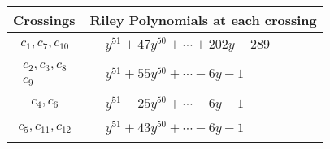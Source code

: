 \documentclass[1p]{elsarticle_modified}
\theoremstyle{definition}
\begin{document}
\begin{tabular}{m{50pt}|m{274pt}}
Crossings & \hspace{64pt}Riley Polynomials at each crossing \\
\hline $$\begin{aligned}c_{1},c_{7},c_{10}\end{aligned}$$&$\begin{aligned}
&y^{51}+47 y^{50}+\cdots+202 y-289
\end{aligned}$\\
\hline $$\begin{aligned}c_{2},c_{3},c_{8}\\c_{9}\end{aligned}$$&$\begin{aligned}
&y^{51}+55 y^{50}+\cdots-6 y-1
\end{aligned}$\\
\hline $$\begin{aligned}c_{4},c_{6}\end{aligned}$$&$\begin{aligned}
&y^{51}-25 y^{50}+\cdots-6 y-1
\end{aligned}$\\
\hline $$\begin{aligned}c_{5},c_{11},c_{12}\end{aligned}$$&$\begin{aligned}
&y^{51}+43 y^{50}+\cdots-6 y-1
\end{aligned}$\\
\hline
\end{tabular}
\vskip 2pc
\end{document}

